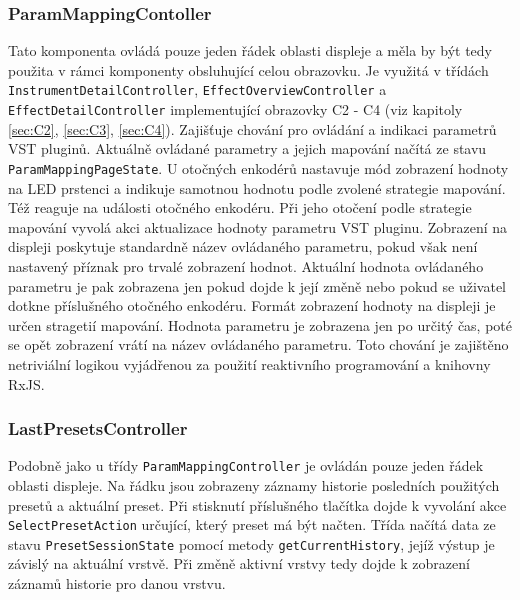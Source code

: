 \documentclass[thesis=M,czech]{FITthesis}[2019/03/06]
\begin{document}
			\subsubsection{ParamMappingContoller}
				Tato komponenta ovládá pouze jeden řádek oblasti displeje a měla by být tedy použita v rámci komponenty obsluhující celou obrazovku.
				Je využitá v třídách \texttt{Instrument\-Detail\-Controller}, \texttt{Effect\-Overview\-Controller} a \texttt{Effect\-Detail\-Controller} implementující obrazovky C2 - C4 (viz kapitoly \ref{sec:C2}, \ref{sec:C3}, \ref{sec:C4}). Zajišťuje chování pro ovládání a indikaci parametrů VST pluginů. Aktuálně ovládané parametry a jejich mapování načítá ze stavu \texttt{Param\-Mapping\-Page\-State}.
				U otočných enkodérů nastavuje mód zobrazení hodnoty na LED prstenci a indikuje samotnou hodnotu podle zvolené strategie mapování. Též
				reaguje na události otočného enkodéru. Při jeho otočení podle strategie mapování vyvolá akci aktualizace hodnoty parametru VST pluginu.
				Zobrazení na displeji poskytuje standardně název ovládaného parametru, pokud však není nastavený příznak pro trvalé 
				zobrazení hodnot.
				Aktuální hodnota ovládaného parametru je pak zobrazena jen pokud dojde k její změně nebo pokud se uživatel dotkne příslušného otočného enkodéru.
				Formát zobrazení hodnoty na displeji je určen stragetií mapování.
				Hodnota parametru je zobrazena jen po určitý čas, poté se opět zobrazení vrátí na název ovládaného parametru. 
				Toto chování je zajištěno netriviální logikou vyjádřenou za použití reaktivního programování a knihovny RxJS.
				
			\subsubsection{LastPresetsController}
				Podobně jako u třídy \texttt{Param\-Mapping\-Controller} je ovládán pouze jeden řádek oblasti displeje. Na řádku jsou zobrazeny
				záznamy historie posledních použitých presetů a aktuální preset. Při stisknutí příslušného tlačítka dojde k vyvolání 
				akce \texttt{Select\-Preset\-Action} určující, který preset má být načten. Třída načítá data ze stavu \texttt{Preset\-Session\-State}
				pomocí metody \texttt{get\-Current\-History}, jejíž výstup je závislý na aktuální vrstvě. Při změně aktivní vrstvy tedy dojde
				k zobrazení záznamů historie pro danou vrstvu.
							
\end{document}
